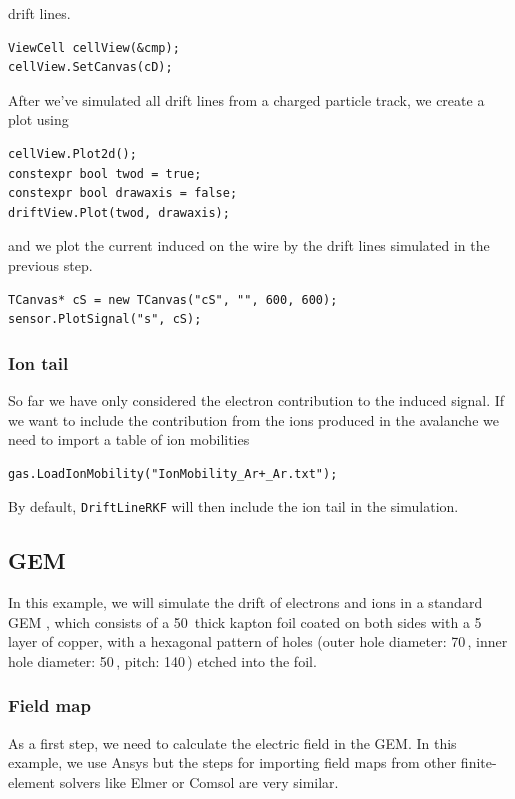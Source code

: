 drift lines.
\begin{lstlisting}
ViewCell cellView(&cmp);
cellView.SetCanvas(cD);
\end{lstlisting}
After we've simulated all drift lines from a charged particle 
track, we create a plot using
\begin{lstlisting}
cellView.Plot2d();
constexpr bool twod = true;
constexpr bool drawaxis = false;
driftView.Plot(twod, drawaxis);
\end{lstlisting}
and we plot the current induced on 
the wire by the drift lines simulated in the previous step.
\begin{lstlisting}
TCanvas* cS = new TCanvas("cS", "", 600, 600);
sensor.PlotSignal("s", cS);
\end{lstlisting}

\subsubsection{Ion tail}
So far we have only considered the electron contribution 
to the induced signal. 
If we want to include the contribution from the ions produced in 
the avalanche we need to import a table of ion mobilities
\begin{lstlisting}
gas.LoadIonMobility("IonMobility_Ar+_Ar.txt");
\end{lstlisting}
By default, \texttt{DriftLineRKF} will then include the ion tail in the simulation. 

\subsection{GEM}\label{Sec:ExampleGem}
In this example, we will simulate the drift of electrons and ions 
in a standard GEM \cite{Sauli2016}, 
which consists of a 50\, thick kapton foil 
coated on both sides with a 5\, layer of copper, 
with a hexagonal pattern of holes (outer hole diameter: 70\,, 
inner hole diameter: 50\,, pitch: 140\,) 
etched into the foil.
\subsubsection{Field map}
As a first step, we need to calculate the electric field in the GEM. 
In this example, we use Ansys \cite{ANSYS} but the steps for importing 
field maps from other finite-element solvers like
Elmer \cite{Elmer} or Comsol \cite{Comsol} are very similar.

